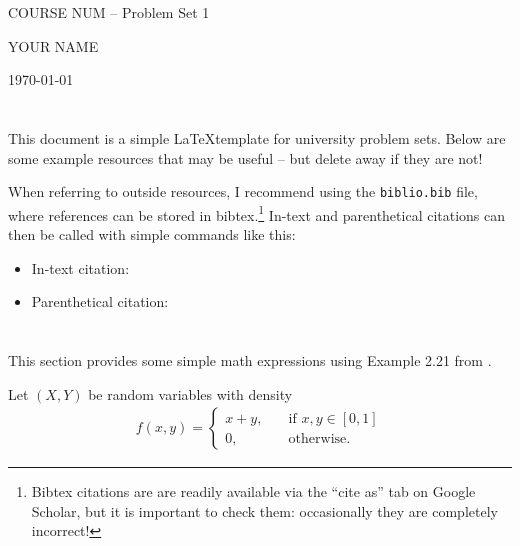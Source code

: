 



{\LARGE \centering COURSE NUM -- Problem Set 1\par}
{\vspace{-1em} \large \centering YOUR NAME \par}
{\centering \vspace{-1em} \today \par }

\section{}
This document is a simple \LaTeX template for university problem sets. Below are some example resources that may be useful -- but delete away if they are not! 

When referring to outside resources, I recommend using the \texttt{biblio.bib} file, where references can be stored in bibtex.\footnote{Bibtex citations are are readily available via the ``cite as'' tab on Google Scholar, but it is important to check them: occasionally they are completely incorrect!} In-text and parenthetical citations can then be called with simple commands like this:
\begin{itemize}
    \item In-text citation: \citet{wickham2019advanced}
    \item Parenthetical citation: \citep{ceder2018quick}
\end{itemize}

\newpage
\section{}

This section provides some simple math expressions using Example 2.21 from \citet{wasserman2003all}.

Let $(X, Y)$ be random variables with density 
\begin{align}\label{pset1:eq_density}
    f(x, y) = \begin{cases} %
        x + y, & \quad \text{if } x, y \in [0, 1] \\
        0, & \quad \text{otherwise.}
    \end{cases}
\end{align}

